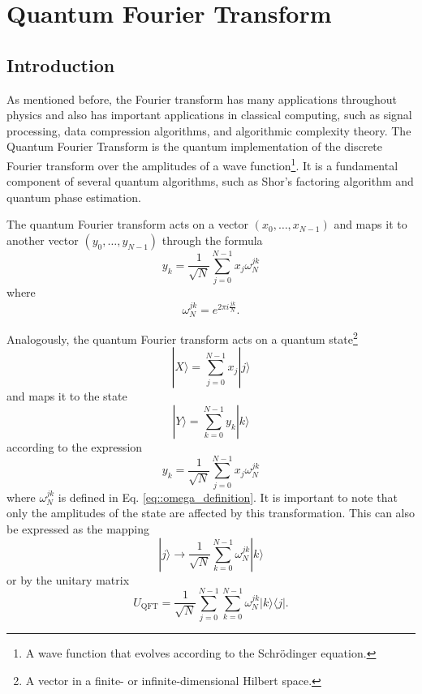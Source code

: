 \documentclass[a4paper]{article}
\begin{document}
\section{Quantum Fourier Transform}
\subsection{Introduction}
As mentioned before, the Fourier transform has many applications throughout physics and also has important applications in classical computing, such as signal processing, data compression algorithms, and algorithmic complexity theory. The Quantum Fourier Transform is the quantum implementation of the discrete Fourier transform over the amplitudes of a wave function\footnote{A wave function that evolves according to the Schr\"{o}dinger equation.}. It is a fundamental component of several quantum algorithms, such as Shor's factoring algorithm and quantum phase estimation.

The quantum Fourier transform acts on a vector $(x_0, \ldots, x_{N-1})$ and maps it to another vector $(y_0, \ldots, y_{N-1})$ through the formula
\begin{equation}
y_{k}=\frac{1}{\sqrt{N}}\sum_{j=0}^{N-1}x_j \omega_{N}^{jk}
\end{equation}
where
\begin{equation}\label{eq::omega_definition}
\omega_{N}^{jk}=e^{2\pi i \frac{jk}{N}}.
\end{equation}

Analogously, the quantum Fourier transform acts on a quantum state\footnote{A vector in a finite- or infinite-dimensional Hilbert space.}
\begin{equation}
|X\rangle=\sum_{j=0}^{N-1} x_{j}|j\rangle
\end{equation}
and maps it to the state
\begin{equation}\label{eq::QFT_general}
|Y\rangle=\sum_{k=0}^{N-1} y_{k}|k\rangle
\end{equation}
according to the expression
\begin{equation}
y_k=\frac{1}{\sqrt{N}}\sum_{j=0}^{N-1}x_j\omega_{N}^{jk}
\end{equation}
where $\omega_{N}^{jk}$ is defined in Eq. \ref{eq::omega_definition}. It is important to note that only the amplitudes of the state are affected by this transformation. This can also be expressed as the mapping
\begin{equation}
|j\rangle \rightarrow \frac{1}{\sqrt{N}}\sum^{N-1}_{k=0}\omega_N^{jk}|k\rangle
\end{equation}
or by the unitary matrix
\begin{equation}
U_{\text{QFT}}=\frac{1}{\sqrt{N}}\sum_{j=0}^{N-1}\sum_{k=0}^{N-1}\omega_{N}^{jk}|k\rangle\langle j|.
\end{equation}
\end{document}
